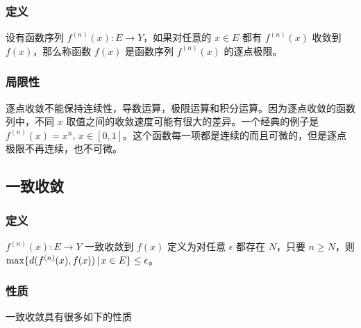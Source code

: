 \subsubsection{定义}

设有函数序列 $f^{(n)}(x): E \to Y$，如果对任意的 $x \in E$ 都有 $f^{(n)}(x)$ 收敛到 $f(x)$，那么称函数 $f(x)$ 是函数序列 $f^{(n)}(x)$ 的逐点极限。

\subsubsection{局限性}

逐点收敛不能保持连续性，导数运算，极限运算和积分运算。因为逐点收敛的函数列中，不同 $x$ 取值之间的收敛速度可能有很大的差异。一个经典的例子是 $f^{(n)}(x) = x^n, \, x \in [0,1]$。这个函数每一项都是连续的而且可微的，但是逐点极限不再连续，也不可微。

\subsection{一致收敛}

\subsubsection{定义}

$f^{(n)}(x): E \to Y$ 一致收敛到 $f(x)$ 定义为对任意 $\epsilon$ 都存在 $N$，只要 $n \ge N$，则 $\max \{ d( f^{(n)}(x), f(x)) \,\vert\, x \in E \} \le \epsilon$。

\subsubsection{性质}

一致收敛具有很多如下的性质

